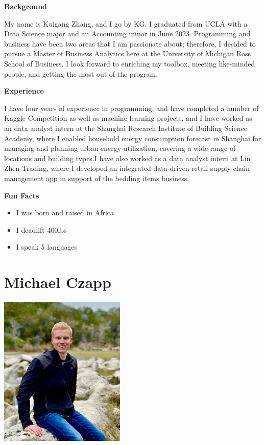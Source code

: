 \documentclass[
]{book}
\begin{document}
\textbf{Background}

My name is Kuigang Zhang, and I go by KG. I graduated from UCLA with a Data Science major and an Accounting minor in June 2023. Programming and business have been two areas that I am passionate about; therefore, I decided to pursue a Master of Business Analytics here at the University of Michigan Ross School of Business. I look forward to enriching my toolbox, meeting like-minded people, and getting the most out of the program.

\textbf{Experience}

I have four years of experience in programming, and have completed a number of Kaggle Competition as well as machine learning projects, and I have worked as an data analyst intern at the Shanghai Research Institute of Building Science Academy, where I enabled household energy consumption forecast in Shanghai for managing and planning urban energy utilization, covering a wide range of locations and building types.I have also worked as a data analyst intern at Lin Zhen Trading, where I developed an integrated data-driven retail supply chain management app in support of the bedding items business.

\textbf{Fun Facts}

\begin{itemize}
\item
  I was born and raised in Africa
\item
  I deadlift 400lbs
\item
  I speak 5 languages
\end{itemize}

\hypertarget{michael-czapp}{%
\section{Michael Czapp}\label{michael-czapp}}

\includegraphics[width=2.36458in,height=\textheight]{Michael Czapp Photo.jpeg}
\end{document}
